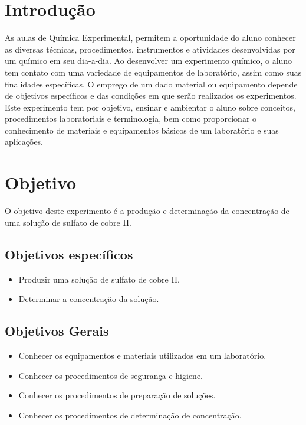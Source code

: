 \documentclass[a4paper, 11pt]{article}
\begin{document}
\newpage
\section{Introdução}\label{sec:introducao}

    \indent As aulas de Química Experimental, permitem a oportunidade do aluno conhecer as diversas técnicas, procedimentos, instrumentos e atividades desenvolvidas por um químico em seu dia-a-dia.
    Ao desenvolver um experimento químico, o aluno tem contato com uma variedade de equipamentos de laboratório, assim como suas finalidades específicas.
    O emprego de um dado material ou equipamento depende de objetivos específicos e das condições em que serão realizados os experimentos.\\
    \indent Este experimento tem por objetivo, ensinar e ambientar o aluno sobre conceitos, procedimentos laboratoriais e terminologia, bem como proporcionar o conhecimento de materiais e equipamentos básicos de um laboratório e suas aplicações.

\section{Objetivo}\label{sec:objetivo}

    \indent O objetivo deste experimento é a produção e determinação da concentração de uma solução de sulfato de cobre II\@.

    \subsection*{Objetivos específicos}\label{sec:objetivos_especificos}

        \begin{itemize}
            \item Produzir uma solução de sulfato de cobre II\@.
            \item Determinar a concentração da solução\@.
        \end{itemize}

    \subsection*{Objetivos Gerais}\label{sec:objetivos_gerais}

        \begin{itemize}
            \item Conhecer os equipamentos e materiais utilizados em um laboratório\@.
            \item Conhecer os procedimentos de segurança e higiene\@.
            \item Conhecer os procedimentos de preparação de soluções\@.
            \item Conhecer os procedimentos de determinação de concentração\@.
        \end{itemize}
\end{document}
